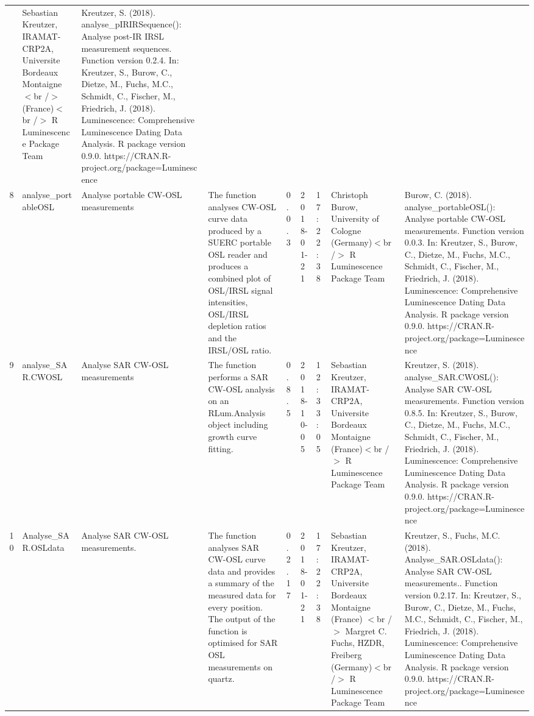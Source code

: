 \begin{table}[ht]
\begin{tabular}{rllllllll}
 & Sebastian Kreutzer, IRAMAT-CRP2A, Universite Bordeaux Montaigne$<$br /$>$ (France)$<$br /$>$  R Luminescence Package Team & Kreutzer, S. (2018). analyse\_pIRIRSequence(): Analyse post-IR IRSL measurement sequences. Function version 0.2.4. In: Kreutzer, S., Burow, C., Dietze, M., Fuchs, M.C., Schmidt, C., Fischer, M., Friedrich, J. (2018). Luminescence: Comprehensive Luminescence Dating Data Analysis. R package version 0.9.0. https://CRAN.R-project.org/package=Luminescence
 \\ 
  8 & analyse\_portableOSL & Analyse portable CW-OSL measurements & The function analyses CW-OSL curve data produced by a SUERC portable OSL reader and produces a combined plot of OSL/IRSL signal intensities, OSL/IRSL depletion ratios and the IRSL/OSL ratio. & 0.0.3 & 2018-01-21 & 17:22:38
 & Christoph Burow, University of Cologne (Germany)$<$br /$>$  R Luminescence Package Team & Burow, C. (2018). analyse\_portableOSL(): Analyse portable CW-OSL measurements. Function version 0.0.3. In: Kreutzer, S., Burow, C., Dietze, M., Fuchs, M.C., Schmidt, C., Fischer, M., Friedrich, J. (2018). Luminescence: Comprehensive Luminescence Dating Data Analysis. R package version 0.9.0. https://CRAN.R-project.org/package=Luminescence
 \\ 
  9 & analyse\_SAR.CWOSL & Analyse SAR CW-OSL measurements & The function performs a SAR CW-OSL analysis on an RLum.Analysis  object including growth curve fitting. & 0.8.5 & 2018-10-05 & 12:33:05
 & Sebastian Kreutzer, IRAMAT-CRP2A, Universite Bordeaux Montaigne (France)$<$br /$>$  R Luminescence Package Team & Kreutzer, S. (2018). analyse\_SAR.CWOSL(): Analyse SAR CW-OSL measurements. Function version 0.8.5. In: Kreutzer, S., Burow, C., Dietze, M., Fuchs, M.C., Schmidt, C., Fischer, M., Friedrich, J. (2018). Luminescence: Comprehensive Luminescence Dating Data Analysis. R package version 0.9.0. https://CRAN.R-project.org/package=Luminescence
 \\ 
  10 & Analyse\_SAR.OSLdata & Analyse SAR CW-OSL measurements. & The function analyses SAR CW-OSL curve data and provides a summary of the measured data for every position. The output of the function is optimised for SAR OSL measurements on quartz. & 0.2.17 & 2018-01-21 & 17:22:38
 & Sebastian Kreutzer, IRAMAT-CRP2A, Universite Bordeaux Montaigne (France) $<$br /$>$ Margret C. Fuchs, HZDR, Freiberg (Germany)$<$br /$>$  R Luminescence Package Team & Kreutzer, S., Fuchs, M.C. (2018). Analyse\_SAR.OSLdata(): Analyse SAR CW-OSL measurements.. Function version 0.2.17. In: Kreutzer, S., Burow, C., Dietze, M., Fuchs, M.C., Schmidt, C., Fischer, M., Friedrich, J. (2018). Luminescence: Comprehensive Luminescence Dating Data Analysis. R package version 0.9.0. https://CRAN.R-project.org/package=Luminescence

\end{tabular}
\end{table}
